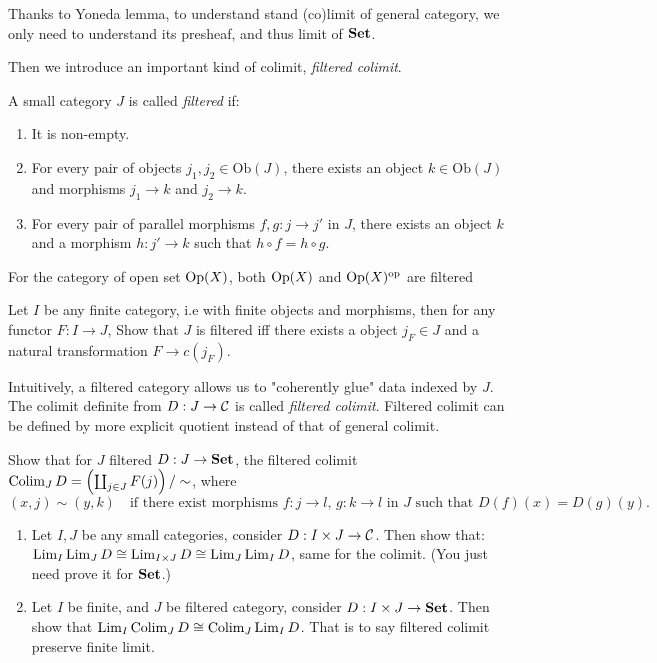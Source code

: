 Thanks to Yoneda lemma, to understand stand (co)limit of general category, we only need to understand its presheaf, and thus limit of $\mathbf{Set}$.


Then we introduce an important kind of colimit, \emph{filtered colimit}. 
\begin{definition}
  A small category $J$ is called \emph{filtered} if:
  \begin{enumerate}
        \item It is non-empty.
              \item For every pair of objects $j_1, j_2 \in \mathrm{Ob}(J)$, there exists an object $k \in \mathrm{Ob}(J)$ and morphisms $j_1 \to k$ and $j_2 \to k$.
                    \item For every pair of parallel morphisms $f, g : j \to j'$ in $J$, there exists an object $k$ and a morphism $h : j' \to k$ such that $h \circ f = h \circ g$.
  \end{enumerate}
\end{definition} 
\begin{example}
 For the category of open set $\mathrm{Op}(X)$, both $\mathrm{Op}(X)$ and $\mathrm{Op}(X)^{\mathrm{op}}$ are filtered
\end{example}
\begin{exercise}
 Let $I$ be any finite category, i.e with finite objects and morphisms, then for any functor $F:I\to J$, Show that $J$ is filtered iff there exists a object $j_F \in J$ and a natural transformation $F\to c(j_F)$.
\end{exercise}
Intuitively, a filtered category allows us to "coherently glue" data indexed by $J$. The colimit definite from $D: J\to \mathcal{C}$ is called \emph{filtered colimit}. Filtered colimit can be defined by more explicit quotient instead of that of general colimit.
\begin{exercise}
  Show that for $J$ filtered $D:J\to\mathbf{Set}$, the filtered colimit $\operatorname*{\mathrm{Colim}}_J D = \left( \coprod_{j \in J} F(j)\right) / \sim$, where 
\[
    (x, j) \sim (y, k) \quad \text{if there exist morphisms } f : j \to l,\, g : k \to l \text{ in } J \text{ such that } D(f)(x) = D(g)(y).
    \]
\end{exercise}
  \begin{exercise}
   \begin{enumerate}
     \item Let $I,J$ be any small categories, consider $D: I \times J \to \mathcal{C}$. Then show that: $\operatorname*{\mathrm{Lim}}_I\operatorname*{\mathrm{Lim}}_J D \cong \operatorname*{\mathrm{Lim}}_{I\times J} D \cong \operatorname*{\mathrm{Lim}}_J\operatorname*{\mathrm{Lim}}_I D$, same for the colimit. (You just need prove it for $\mathbf{Set}$.)
     \item Let $I$ be finite, and $J$ be filtered category, consider $D:I\times J \to \mathbf{Set}$. Then show that $\operatorname*{\mathrm{Lim}}_I\operatorname*{\mathrm{Colim}}_J D \cong \operatorname*{\mathrm{Colim}}_J\operatorname*{\mathrm{Lim}}_I D$. That is to say filtered colimit preserve finite limit.
   \end{enumerate} 
  \end{exercise}
